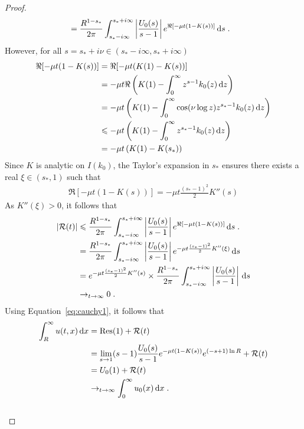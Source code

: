 \begin{proof}
\begin{align*}
                &= \frac{R^{1-s_*}}{2\pi} \int_{s_*-i\infty}^{s_*+i\infty} \left|\frac{U_0(s) }{s-1}\right| e^{\Re[-\mu t(1 - K(s))]} \,\mathrm{d} s
                \; .
            \end{align*}
            However, for all $s = s_* + i\nu \in (s_*-i \infty, s_* + i \infty)$
            \begin{align*}
                \Re[-\mu t(1 - K(s))] 
                &= \Re[-\mu t(K(1) - K(s))] \\
                &= -\mu t \Re\left( K(1) - \int_0^\infty z^{s-1}k_0(z)\,\mathrm{d} z  \right) \\
                &=  -\mu t\left( K(1) - \int_0^\infty \cos(\nu \log z) z^{s_*-1}k_0(z)\,\mathrm{d} z  \right) \\
                &\leqslant -\mu t \left( K(1) - \int_0^\infty z^{s_*-1}k_0(z)\,\mathrm{d} z  \right) \\
                &= -\mu t \left( K(1) - K(s_*)  \right)
            \end{align*}
            Since $K$ is analytic on $I(k_0)$, the Taylor's expansion in $s_*$ ensures there exists a real $\xi \in (s_*, 1)$ such that 
            \begin{align*}
                \Re[-\mu t(1 - K(s))] = - \mu t \frac{(s_*-1)^2}{2}  K''(s) 
            \end{align*}
            As $ K''(\xi) > 0$, it follows that 
            \begin{align*}
                |\mathcal{R}(t)| 
                &\leqslant \frac{R^{1-s_*}}{2\pi} \int_{s_*-i\infty}^{s_*+i\infty} \left|\frac{U_0(s) }{s-1}\right| e^{\Re[-\mu t(1 - K(s))]} \,\mathrm{d} s
                \; . \\
                &= \frac{R^{1-s_*}}{2\pi} \int_{s_*-i\infty}^{s_*+i\infty} \left|\frac{U_0(s) }{s-1}\right| e^{- \mu t \frac{(s_*-1)^2}{2}  K''(\xi) } \,\mathrm{d} s \\
                &= e^{- \mu t \frac{(s_*-1)^2}{2}  K''(s)} \times \frac{R^{1-s_*}}{2\pi} \int_{s_*-i\infty}^{s_*+i\infty} \left|\frac{U_0(s) }{s-1}\right| \,\mathrm{d} s \\
                &\to_{t \to \infty} 0
                \; .
            \end{align*}
            Using Equation~\ref{eq:cauchy1}, it follows that 
            \begin{align*}
                \int_R^\infty u(t,x) \,\mathrm{d} x &= \mathrm{Res(1)} + \mathcal{R}(t) \\
                &= \lim_{s \to 1} (s-1)\frac{U_0(s)}{s-1} e^{-\mu t(1 - K(s))} e^{(-s+1)\ln R}  + \mathcal{R}(t)\\
                &= U_0(1) + \mathcal{R}(t)\\
                &\to_{t \to \infty} \int_0^\infty u_0(x) \,\mathrm{d} x
                \; .
            \end{align*}\\
            

\end{proof}

